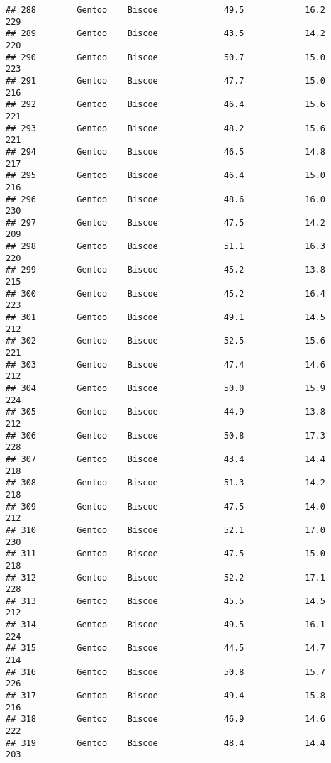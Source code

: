 \documentclass[
]{article}
\begin{document}
\begin{verbatim}
## 288        Gentoo    Biscoe             49.5            16.2               229
## 289        Gentoo    Biscoe             43.5            14.2               220
## 290        Gentoo    Biscoe             50.7            15.0               223
## 291        Gentoo    Biscoe             47.7            15.0               216
## 292        Gentoo    Biscoe             46.4            15.6               221
## 293        Gentoo    Biscoe             48.2            15.6               221
## 294        Gentoo    Biscoe             46.5            14.8               217
## 295        Gentoo    Biscoe             46.4            15.0               216
## 296        Gentoo    Biscoe             48.6            16.0               230
## 297        Gentoo    Biscoe             47.5            14.2               209
## 298        Gentoo    Biscoe             51.1            16.3               220
## 299        Gentoo    Biscoe             45.2            13.8               215
## 300        Gentoo    Biscoe             45.2            16.4               223
## 301        Gentoo    Biscoe             49.1            14.5               212
## 302        Gentoo    Biscoe             52.5            15.6               221
## 303        Gentoo    Biscoe             47.4            14.6               212
## 304        Gentoo    Biscoe             50.0            15.9               224
## 305        Gentoo    Biscoe             44.9            13.8               212
## 306        Gentoo    Biscoe             50.8            17.3               228
## 307        Gentoo    Biscoe             43.4            14.4               218
## 308        Gentoo    Biscoe             51.3            14.2               218
## 309        Gentoo    Biscoe             47.5            14.0               212
## 310        Gentoo    Biscoe             52.1            17.0               230
## 311        Gentoo    Biscoe             47.5            15.0               218
## 312        Gentoo    Biscoe             52.2            17.1               228
## 313        Gentoo    Biscoe             45.5            14.5               212
## 314        Gentoo    Biscoe             49.5            16.1               224
## 315        Gentoo    Biscoe             44.5            14.7               214
## 316        Gentoo    Biscoe             50.8            15.7               226
## 317        Gentoo    Biscoe             49.4            15.8               216
## 318        Gentoo    Biscoe             46.9            14.6               222
## 319        Gentoo    Biscoe             48.4            14.4               203

\end{verbatim}
\end{document}
